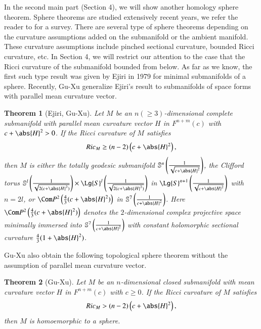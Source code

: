 \documentclass[12pt]{amsart}
\theoremstyle{plain}
\newtheorem{known}{Theorem}
\theoremstyle{remark}
\theoremstyle{definition}
\numberwithin{equation}{section}
\begin{document}
In the second main part (Section 4), we will show another homology
sphere theorem.
Sphere theorems are studied extensively recent years, we refer the reader to \cite{XuGu13}
for a survey. There are several type of
sphere theorems depending on the curvature assumptions
 added on the submanifold or the ambient manifold. These curvature assumptions include
  pinched sectional curvature,
 bounded Ricci curvature, etc.
In Section 4, we will restrict our attention to the case that the Ricci curvature of the
submanifold bounded from below.
As far as we know, the first such type result was given by Ejiri in 1979
for minimal submanifolds of a sphere. Recently, Gu-Xu generalize Ejiri's result to submanifolds of space forms with parallel mean curvature vector.

\begin{known}[Ejiri\cite{Eji79}, Gu-Xu\cite{XuGu13}]
Let $M$ be an $n(\geq3)$-dimensional complete submanifold with parallel mean curvature vector $H$ in $F^{n+m}(c)$ with $c+\abs{H}^2>0$. If the Ricci curvature of $M$ satisfies
\begin{align*}
Ric_M\geq(n-2)\left(c+\abs{H}^2\right),
\end{align*}
then $M$ is either the totally geodesic submanifold $\mathbb{S}^n\left(\tfrac{1}{\sqrt{c+\abs{H}^2}}\right)$, the Clifford torus $\mathbb{S}^l\left(\tfrac{1}{\sqrt{2(c+\abs{H}^2)}}\right)\times\Lg{S}^l\left(\tfrac{1}{\sqrt{2(c+\abs{H}^2)}}\right)$ in $\Lg{S}^{n+1}\left(\tfrac{1}{\sqrt{c+\abs{H}^2}}\right)$ with $n=2l$, or $\Com P^2\left(\tfrac{4}{3}(c+\abs{H}^2)\right)$ in $\mathbb{S}^7\left(\tfrac{1}{c+\abs{H}^2}\right)$. Here $\Com P^2\left(\tfrac{4}{3}(c+\abs{H}^2)\right)$ denotes the $2$-dimensional complex projective space minimally immersed into $\mathbb{S}^7\left(\tfrac{1}{c+\abs{H}^2}\right)$ with constant holomorphic sectional curvature $\tfrac{4}{3}(1+\abs{H}^2)$.
\end{known}
Gu-Xu \cite{XuGu13} also obtain the following topological sphere theorem without the assumption of parallel mean curvature vector.
\begin{known}[Gu-Xu\cite{XuGu13}]\label{GXthm}Let $M$ be an $n$-dimensional closed submanifold with mean curvature vector $H$ in $F^{n+m}(c)$ with $c\geq0$. If the Ricci curvature of $M$ satisfies
\begin{align}\label{eq:condition-eriji}
Ric_M>(n-2)\left(c+\abs{H}^2\right),
\end{align}
then $M$ is homoemorphic to a sphere.
\end{known}
\end{document}
